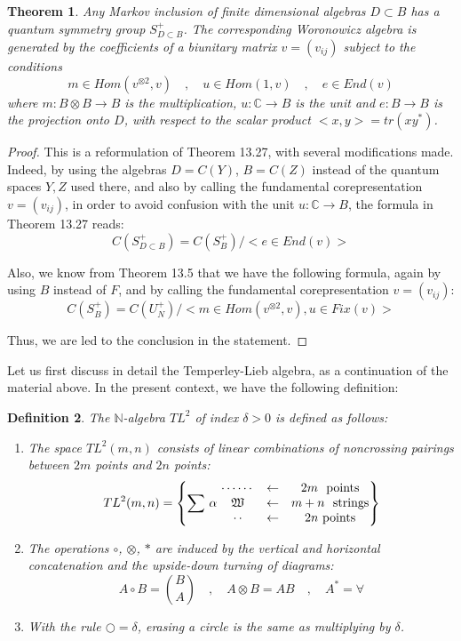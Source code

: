 \documentclass[12pt]{amsbook}
\newtheorem{theorem}{Theorem}[chapter]
\newtheorem{definition}[theorem]{Definition}
\begin{document}
\begin{theorem}
Any Markov inclusion of finite dimensional algebras $D\subset B$ has a quantum symmetry group $S_{D\subset B}^+$. The corresponding Woronowicz algebra is generated by the coefficients of a biunitary matrix $v=(v_{ij})$ subject to the conditions
$$m\in Hom(v^{\otimes 2},v)\quad,\quad 
u\in Hom(1,v)\quad,\quad 
e\in End(v)$$
where $m:B\otimes B\to B$ is the multiplication, $u:\mathbb C\to B$ is the unit and $e:B\to B$ is the projection onto $D$, with respect to the scalar product $<x,y>=tr(xy^*)$.
\end{theorem}

\begin{proof}
This is a reformulation of Theorem 13.27, with several modifications made. Indeed, by using the algebras $D=C(Y)$, $B=C(Z)$ instead of the quantum spaces $Y,Z$ used there, and also by calling the fundamental corepresentation $v=(v_{ij})$, in order to avoid confusion with the unit $u:\mathbb C\to B$, the formula in Theorem 13.27 reads:
$$C(S_{D\subset B}^+)=C(S_B^+)\Big/\Big<e\in End(v)\Big>$$

Also, we know from Theorem 13.5 that we have the following formula, again by using $B$ instead of $F$, and by calling the fundamental corepresentation $v=(v_{ij})$:
$$C(S_B^+)=C(U_N^+)\Big/\Big<m\in Hom(v^{\otimes2},v),u\in Fix(v)\Big>$$

Thus, we are led to the conclusion in the statement.
\end{proof}

Let us first discuss in detail the Temperley-Lieb algebra, as a continuation of the material above. In the present context, we have the following definition:

\begin{definition}
The $\mathbb N$-algebra $TL^2$ of index $\delta >0$ is defined as follows:
\begin{enumerate}
\item The space $TL^2(m,n)$ consists of linear combinations
of noncrossing pairings between $2m$ points and $2n$ points:
$${{TL^2}}(m,n)=
\left\{\sum\,\alpha\,\,
\begin{matrix}\cdots\cdots&\leftarrow&2m\,\,\ {\rm points}\\
\mathfrak{W}&\leftarrow&m+n\ \ {\rm strings}\\
\cdot\,\cdot&\leftarrow&2n\,\,{\rm points}
\end{matrix}\right\}$$

\item The operations $\circ$, $\otimes$, $*$ are induced by the vertical and horizontal concatenation and the upside-down turning of diagrams:
$$A\circ B=\binom{B}{A}\quad,\quad A\otimes B=AB\quad,\quad A^*=\forall$$

\item With the rule $\bigcirc=\delta$, erasing a circle is the same as multiplying by $\delta$.
\end{enumerate}
\end{definition}
\end{document}
